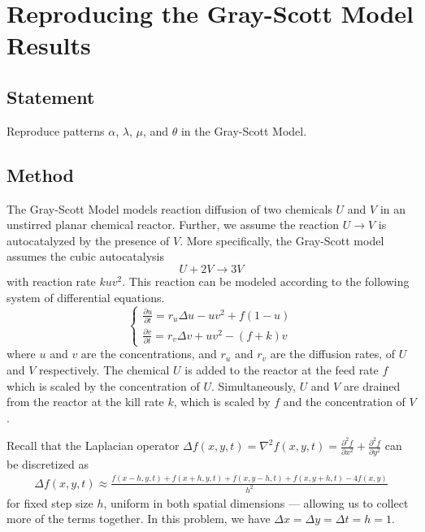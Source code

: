 \section{Reproducing the Gray-Scott Model Results}

\subsection{Statement}
Reproduce patterns $\alpha$, $\lambda$, $\mu$, and $\theta$ in the Gray-Scott Model.


\subsection{Method}

The Gray-Scott Model models reaction diffusion of two chemicals $U$ and $V$ in an unstirred planar chemical reactor.
Further, we assume the reaction $U \to V$ is autocatalyzed by the presence of $V$.
More specifically, the Gray-Scott model assumes the cubic autocatalysis
\begin{equation}
    U + 2V \to 3V
\end{equation}
with reaction rate $kuv^2$.
This reaction can be modeled according to the following system of differential equations.
\begin{equation}
    \begin{cases}
        \displaystyle{\frac{\partial u}{\partial t} = r_u \Delta u - uv^2 + f(1 - u)} \\[10pt]
        \displaystyle{\frac{\partial v}{\partial t} = r_v \Delta v + uv^2 - (f + k)v}
    \end{cases}\label{prob5:eqn:gray-scott}
\end{equation}
where $u$ and $v$ are the concentrations, and $r_u$ and $r_v$ are the diffusion rates, of $U$ and $V$ respectively.
The chemical $U$ is added to the reactor at the feed rate $f$ which is scaled by the concentration of $U$.
Simultaneously, $U$ and $V$ are drained from the reactor at the kill rate $k$, which is scaled by $f$ and the concentration of $V$.

Recall that the Laplacian operator $\displaystyle\Delta f(x, y, t) = \nabla^2 f(x, y, t) = \frac{\partial^2 f}{\partial x^2} + \frac{\partial^2 f}{\partial y^2}$ can be discretized as
\begin{align}
    \Delta f(x, y, t) \approx \frac{f(x - h, y, t) + f(x + h, y, t) + f(x, y - h, t) + f(x, y + h, t) - 4f(x, y)}{h^2}\label{prob5:eqn:discrete-laplacian-operator}
\end{align}
for fixed step size $h$, uniform in both spatial dimensions --- allowing us to collect more of the terms together.
In this problem, we have $\Delta x = \Delta y = \Delta t = h = 1$.

